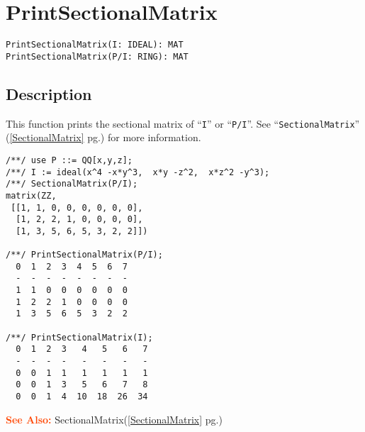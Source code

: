 \documentclass[a4paper]{mybook}
\newenvironment{command}{}{} %
\newcommand\SeeAlso{\par\textcolor{OrangeRed}{\textbf{\large See Also: }}}
\begin{document}
\section{PrintSectionalMatrix}
\label{PrintSectionalMatrix}
\begin{command} %


\begin{Verbatim}[label=syntax, rulecolor=\color{MidnightBlue},
frame=single]
PrintSectionalMatrix(I: IDEAL): MAT
PrintSectionalMatrix(P/I: RING): MAT
\end{Verbatim}


\subsection*{Description}

This function prints the sectional matrix of ``\verb&I&'' or ``\verb&P/I&''.
See ``\verb&SectionalMatrix&'' (\ref{SectionalMatrix} pg.\pageref{SectionalMatrix}) for more information.
\begin{Verbatim}[label=example, rulecolor=\color{PineGreen}, frame=single]
/**/ use P ::= QQ[x,y,z];
/**/ I := ideal(x^4 -x*y^3,  x*y -z^2,  x*z^2 -y^3);
/**/ SectionalMatrix(P/I);
matrix(ZZ,
 [[1, 1, 0, 0, 0, 0, 0, 0],
  [1, 2, 2, 1, 0, 0, 0, 0],
  [1, 3, 5, 6, 5, 3, 2, 2]])

/**/ PrintSectionalMatrix(P/I);
  0  1  2  3  4  5  6  7
  -  -  -  -  -  -  -  -
  1  1  0  0  0  0  0  0
  1  2  2  1  0  0  0  0
  1  3  5  6  5  3  2  2

/**/ PrintSectionalMatrix(I);
  0  1  2  3   4   5   6   7
  -  -  -  -   -   -   -   -
  0  0  1  1   1   1   1   1
  0  0  1  3   5   6   7   8
  0  0  1  4  10  18  26  34
\end{Verbatim}


\SeeAlso %
  SectionalMatrix(\ref{SectionalMatrix} pg.\pageref{SectionalMatrix})
\end{command} %
\end{document}
